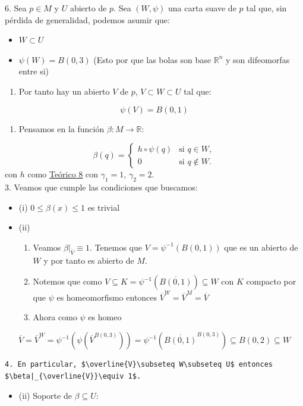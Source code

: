 \begin{bookproof}{}
6. Sea $p\in M$ y $U$ abierto de $p$. Sea $(W,\psi)$ una carta suave de $p$ tal que, sin pérdida de generalidad, podemos asumir que:

\begin{itemize}
\item $W\subset U$
\item $\psi(W)=B(0,3)$ (Esto por que las bolas son base $\mathbb{R}^{n}$ y son difeomorfas entre si)
\end{itemize}
\begin{enumerate}
\item Por tanto hay un abierto $V$ de $p$, $V\subset W\subset U$ tal que:
\end{enumerate}
\[
\psi(V)=B(0,1)
\]
\begin{enumerate}[start=2]
\item Pensamos en la función $\beta:M\to\mathbb{R}$:
\end{enumerate}
\[
\beta(q)=\begin{cases}h\circ\psi(q) & \text{si } q\in W,\\0 & \text{si } q\notin W.\end{cases}
\]
con $h$ como \hyperref[blk:83d0e9]{Teórico 8} con $\gamma_1=1$, $\gamma_2=2$.\\
3. Veamos que cumple las condiciones que buscamos:

\begin{itemize}
\item (i)  $0\le \beta(x)\le 1$ es trivial
\item (ii)

\begin{enumerate}
\item Veamos $\beta|_{\overline{V}}\equiv 1$. Tenemos que $V=\psi^{-1}(B(0,1))$ que es un abierto de $W$ y por tanto es abierto de $M$.
\item Notemos que como $V\subseteq K=\psi ^{-1}(\overline{B(0,1)})\subseteq W$ con $K$ compacto por que $\psi$ es homeomorfismo entonces $\overline{V}^{W}=\overline{V}^{M}=\overline{V}$
\item Ahora como $\psi$ es homeo
\end{enumerate}
\end{itemize}
\[
\overline{V} =\overline{V}^{W}=\psi ^{-1}(\psi(\overline{V}^{B(0,3)}  ))=\psi ^{-1}(\overline{B(0,1)}^{B(0,3)})  \subseteq B(0,2)\subseteq W
\]
\begin{Verbatim}[fontsize=\small]
 4. En particular, $\overline{V}\subseteq W\subseteq U$ entonces $\beta|_{\overline{V}}\equiv 1$.  
\end{Verbatim}
\begin{itemize}
\item (ii) Soporte de $\beta\subseteq U$:


\end{itemize}
\end{bookproof}
